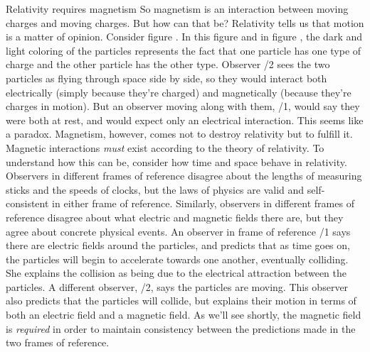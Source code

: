 %
\begin{envsubsection}{Relativity requires magnetism}
So magnetism is an interaction between moving charges and moving charges. But how
can that be?
Relativity tells us that
motion is a matter of opinion. Consider figure . In this figure and in figure
, the dark and light coloring of the particles represents the fact that
one particle has one type of charge and the other particle has the other type.
Observer /2 sees the two particles as flying through space side by side, so they
would interact both electrically (simply because they're charged) and magnetically
(because they're charges in motion). But an observer moving along with them,  /1, would
say they were both at rest, and would expect only an electrical interaction. This seems
like a paradox.
Magnetism, however, comes not to destroy relativity but to fulfill it. Magnetic interactions
	\emph{must} exist according to the theory of relativity. To understand how this can be,
	consider how time and space behave in relativity. Observers in different frames of reference
	disagree about the lengths of measuring sticks and the speeds of clocks, but the laws
	of physics are valid and self-consistent in either frame of reference.
	Similarly, observers in different frames of reference disagree about what electric and magnetic
	fields there are, but they agree about concrete physical events.
	An observer in frame of reference /1
	says there are electric fields around the particles, and predicts that as time goes on, the
	particles will begin to accelerate towards one another, eventually colliding. She explains the
	collision as being due to the electrical attraction between the particles.
	A different observer, /2, says the particles are moving. This observer
	also predicts that the particles will collide, but explains their motion in terms of both
	an electric field and a magnetic field. As we'll see shortly, the
	magnetic field is \emph{required} in order to maintain consistency between the predictions made
	in the two frames of reference.
	

\end{envsubsection}

